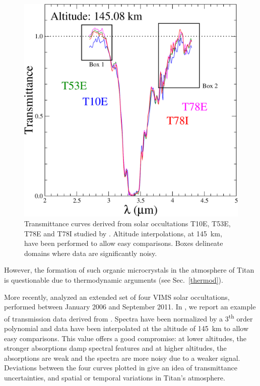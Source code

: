 \documentclass{arxiv-icarus}
\begin{document}
\begin{figure}[!ht]
    \includegraphics[width=.9\linewidth]{Fig_1}
    \caption{Transmittance curves derived from solar occultations T10E, T53E, T78E and T78I studied by \cite{Maltagliati2015}.
    Altitude interpolations, at \SI{145}{km}, have been performed to allow easy comparisons. Boxes delineate domains where data are
    significantly noisy.}
    \label{fig:estim}
\end{figure}

However, the formation of such organic microcrystals in the atmosphere of Titan is questionable due to thermodynamic arguments (see Sec.~\ref{thermod}).

More recently, \cite{Maltagliati2015} analyzed an extended set of four VIMS solar occultations, performed between
January 2006 and September 2011. In , we report an example of transmission data derived from \cite{Maltagliati2015}.
Spectra have been normalized by a 3\textsuperscript{th} order polynomial and data have been interpolated at the altitude of \SI{145}{km} to allow easy comparisons. This value offers a good compromise: at lower altitudes, the stronger absorptions damp spectral features and at higher altitudes, the absorptions are weak and the spectra are more noisy due to a weaker signal.
Deviations between the four curves plotted in  give an idea of transmittance uncertainties, and spatial or temporal variations in Titan's atmosphere.
\end{document}
